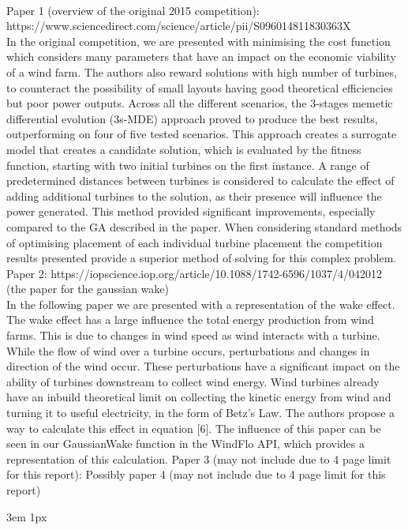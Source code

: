 \documentclass{article}
\begin{document}
\\
Paper 1 (overview of the original 2015 competition): \newline
https://www.sciencedirect.com/science/article/pii/S096014811830363X
\\
\newline
In the original competition, we are presented with minimising the cost function which considers many parameters that have an impact on the economic viability of a wind farm. The authors also reward solutions with high number of turbines, to counteract the possibility of small layouts having good theoretical efficiencies but poor power outputs. Across all the different scenarios, the 3-stages memetic differential evolution (3s-MDE) approach proved to produce the best results, outperforming on four of five tested scenarios. This approach creates a surrogate model that creates a candidate solution, which is evaluated by the fitness function, starting with two initial turbines on the first instance. A range of predetermined distances between turbines is considered to calculate the effect of adding additional turbines to the solution, as their presence will influence the power generated. This method provided significant improvements, especially compared to the GA described in the paper. When considering standard methods of optimising placement of each individual turbine placement the competition results presented provide a superior method of solving for this complex problem.  
\\
\newline
Paper 2: https://iopscience.iop.org/article/10.1088/1742-6596/1037/4/042012 (the paper for the gaussian wake)
\\
In the following paper we are presented with a representation of the wake effect. The wake effect has a large influence the total energy production from wind farms. This is due to changes in wind speed as wind interacts with a turbine. While the flow of wind over a turbine occurs, perturbations and changes in direction of the wind occur. These perturbations have a significant impact on the ability of turbines downstream to collect wind energy. Wind turbines already have an inbuild theoretical limit on collecting the kinetic energy from wind and turning it to useful electricity, in the form of Betz’s Law. The authors propose a way to calculate this effect in equation [6]. The influence of this paper can be seen in our GaussianWake function in the WindFlo API, which provides a representation of this calculation. 
Paper 3 (may not include due to 4 page limit for this report):
Possibly paper 4 (may not include due to 4 page limit for this report)


\singlespacing
\emergencystretch 3em
\hfuzz 1px
\printbibliography[heading=bibnumbered]




\end{document}
